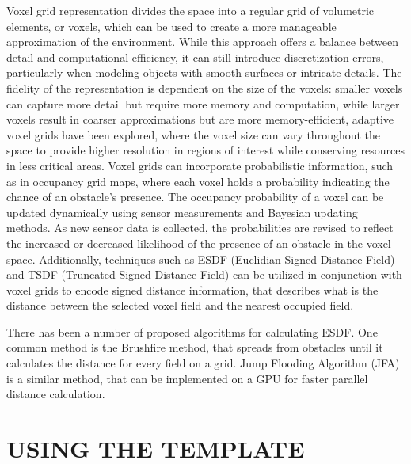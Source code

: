 \documentclass[letterpaper, 10 pt, conference]{ieeeconf}  %
\begin{document}
Voxel grid representation divides the space into a regular grid of volumetric elements, or voxels, which can be used to create a more manageable approximation of the environment. While this approach offers a balance between detail and computational efficiency, it can still introduce discretization errors, particularly when modeling objects with smooth surfaces or intricate details. The fidelity of the representation is dependent on the size of the voxels: smaller voxels can capture more detail but require more memory and computation, while larger voxels result in coarser approximations but are more memory-efficient, adaptive voxel grids have been explored, where the voxel size can vary throughout the space to provide higher resolution in regions of interest while conserving resources in less critical areas. Voxel grids can incorporate probabilistic information, such as in occupancy grid maps, where each voxel holds a probability indicating the chance of an obstacle's presence. The occupancy probability of a voxel can be updated dynamically using sensor measurements and Bayesian updating methods. As new sensor data is collected, the probabilities are revised to reflect the increased or decreased likelihood of the presence of an obstacle in the voxel space. Additionally, techniques such as ESDF (Euclidian Signed Distance Field) and TSDF (Truncated Signed Distance Field) can be utilized in conjunction with voxel grids to encode signed distance information, that describes what is the distance between the selected voxel field and the nearest occupied field.

There has been a number of proposed algorithms for calculating ESDF. One common method is the Brushfire method, that spreads from obstacles until it calculates the distance for every field on a grid.  Jump Flooding Algorithm (JFA) is a similar method, that can be implemented on a GPU for faster parallel distance calculation.  

\clearpage

\section{USING THE TEMPLATE}
\end{document}
